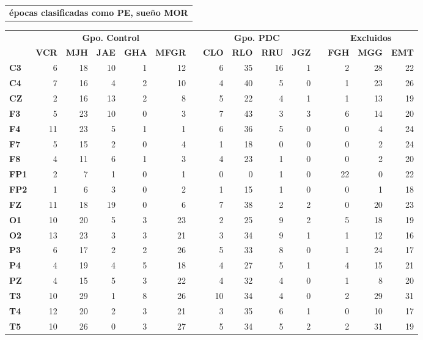 \begin{SidewaysTable}
\centering
\begin{tabular}{c}
\textbf{\'epocas clasificadas como PE, sue\~no MOR}
\vspace{1em}
\end{tabular}
\begin{tabular}{lrrrrrcrrrrcrrr}
\toprule
& \multicolumn{5}{c}{\textbf{Gpo. Control}} && 
  \multicolumn{4}{c}{\textbf{Gpo. PDC}} && 
  \multicolumn{3}{c}{\textbf{Excluidos}}\\
\cmidrule{2-6} \cmidrule{8-11} \cmidrule{13-15}
& \textbf{VCR} & \textbf{MJH} & \textbf{JAE} & \textbf{GHA} & \textbf{MFGR} & \phantom{l}
& \textbf{CLO} & \textbf{RLO} & \textbf{RRU} & \textbf{JGZ} & \phantom{l}
& \textbf{FGH} & \textbf{MGG} & \textbf{EMT} \\
\midrule
\textbf{C3} &6 &18&10&1 &12&&6 &35&16&1 &&2 &28&22 \\
\textbf{C4} &7 &16&4 &2 &10&&4 &40&5 &0 &&1 &23&26 \\
\textbf{CZ} &2 &16&13&2 &8 &&5 &22&4 &1 &&1 &13&19 \\
\rowcolor{gris}
\textbf{F3} &5 &23&10&0 &3 &&7 &43&3 &3 &&6 &14&20 \\
\rowcolor{gris}
\textbf{F4} &11&23&5 &1 &1 &&6 &36&5 &0 &&0 &4 &24 \\
\rowcolor{gris}
\textbf{F7} &5 &15&2 &0 &4 &&1 &18&0 &0 &&0 &2 &24 \\
\rowcolor{gris}
\textbf{F8} &4 &11&6 &1 &3 &&4 &23&1 &0 &&0 &2 &20 \\
\textbf{FP1}&2 &7 &1 &0 &1 &&0 &0 &1 &0 &&22&0 &22 \\
\textbf{FP2}&1 &6 &3 &0 &2 &&1 &15&1 &0 &&0 &1 &18 \\
\textbf{FZ} &11&18&19&0 &6 &&7 &38&2 &2 &&0 &20&23 \\
\rowcolor{gris}
\textbf{O1} &10&20&5 &3 &23&&2 &25&9 &2 &&5 &18&19 \\
\rowcolor{gris}
\textbf{O2} &13&23&3 &3 &21&&3 &34&9 &1 &&1 &12&16 \\
\textbf{P3} &6 &17&2 &2 &26&&5 &33&8 &0 &&1 &24&17 \\
\textbf{P4} &4 &19&4 &5 &18&&4 &27&5 &1 &&4 &15&21 \\
\textbf{PZ} &4 &15&5 &3 &22&&4 &32&4 &0 &&1 &8 &20 \\
\rowcolor{gris}
\textbf{T3} &10&29&1 &8 &26&&10&34&4 &0 &&2 &29&31 \\
\rowcolor{gris}
\textbf{T4} &12&20&2 &3 &21&&3 &35&6 &1 &&0 &10&17 \\
\rowcolor{gris}
\textbf{T5} &10&26&0 &3 &27&&5 &34&5 &2 &&2 &31&19 \\

\end{tabular}
\end{SidewaysTable}
